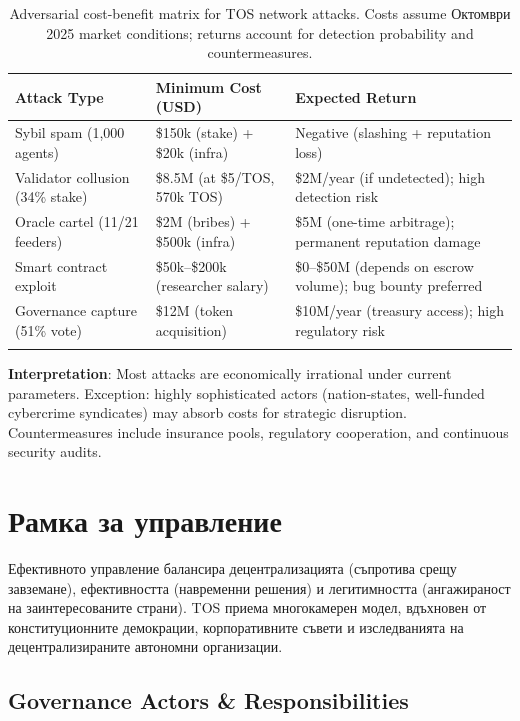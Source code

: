 \documentclass[11pt]{article}
\begin{document}
\begin{longtable}{@{}p{}p{}p{}@{}}
\toprule
\textbf{Attack Type} & \textbf{Minimum Cost (USD)} & \textbf{Expected Return} \\\midrule
Sybil spam (1,000 agents) & \$150k (stake) + \$20k (infra) & Negative (slashing + reputation loss) \\
Validator collusion (34\% stake) & \$8.5M (at \$5/TOS, 570k TOS) & \$2M/year (if undetected); high detection risk \\
Oracle cartel (11/21 feeders) & \$2M (bribes) + \$500k (infra) & \$5M (one-time arbitrage); permanent reputation damage \\
Smart contract exploit & \$50k--\$200k (researcher salary) & \$0--\$50M (depends on escrow volume); bug bounty preferred \\
Governance capture (51\% vote) & \$12M (token acquisition) & \$10M/year (treasury access); high regulatory risk \\
\bottomrule
\caption{Adversarial cost-benefit matrix for TOS network attacks. Costs assume Октомври 2025 market conditions; returns account for detection probability and countermeasures.}
\end{longtable}

\textbf{Interpretation}: Most attacks are economically irrational under current parameters. Exception: highly sophisticated actors (nation-states, well-funded cybercrime syndicates) may absorb costs for strategic disruption. Countermeasures include insurance pools, regulatory cooperation, and continuous security audits.

\section{Рамка за управление}
\label{sec:governance}

Ефективното управление балансира децентрализацията (съпротива срещу завземане), ефективността (навременни решения) и легитимността (ангажираност на заинтересованите страни). TOS приема многокамерен модел, вдъхновен от конституционните демокрации, корпоративните съвети и изследванията на децентрализираните автономни организации.

\subsection{Governance Actors \& Responsibilities}
\end{document}
